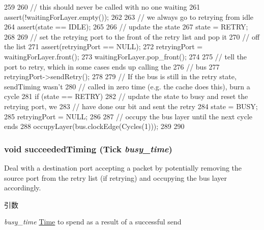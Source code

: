 \begin{DoxyCode}
259 {
260     // this should never be called with no one waiting
261     assert(!waitingForLayer.empty());
262 
263     // we always go to retrying from idle
264     assert(state == IDLE);
265 
266     // update the state
267     state = RETRY;
268 
269     // set the retrying port to the front of the retry list and pop it
270     // off the list
271     assert(retryingPort == NULL);
272     retryingPort = waitingForLayer.front();
273     waitingForLayer.pop_front();
274 
275     // tell the port to retry, which in some cases ends up calling the
276     // bus
277     retryingPort->sendRetry();
278 
279     // If the bus is still in the retry state, sendTiming wasn't
280     // called in zero time (e.g. the cache does this), burn a cycle
281     if (state == RETRY) {
282         // update the state to busy and reset the retrying port, we
283         // have done our bit and sent the retry
284         state = BUSY;
285         retryingPort = NULL;
286 
287         // occupy the bus layer until the next cycle ends
288         occupyLayer(bus.clockEdge(Cycles(1)));
289     }
290 }
\end{DoxyCode}
\hypertarget{classBaseBus_1_1Layer_a63792ad682fd60a25e2896f83452e877}{
\subsubsection[{succeededTiming}]{\setlength{\rightskip}{0pt plus 5cm}void succeededTiming ({\bf Tick} {\em busy\_\-time})}}
\label{classBaseBus_1_1Layer_a63792ad682fd60a25e2896f83452e877}
Deal with a destination port accepting a packet by potentially removing the source port from the retry list (if retrying) and occupying the bus layer accordingly.


\begin{DoxyParams}{引数}
\item[{\em busy\_\-time}]\hyperlink{classTime}{Time} to spend as a result of a successful send \end{DoxyParams}



